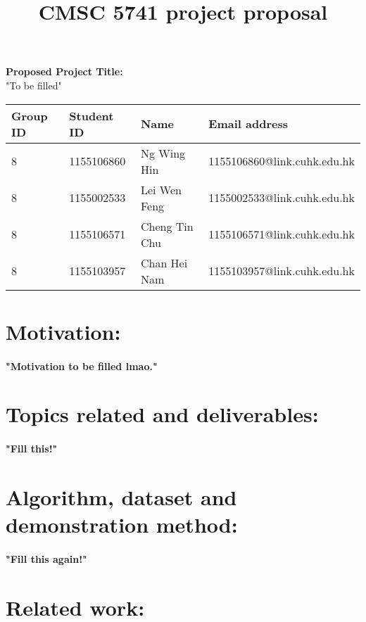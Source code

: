 \documentclass[12pt]{article}
\title{CMSC 5741 project proposal}
\date{}
\begin{document}
  \maketitle
\textbf{Proposed Project Title:}\\

"To be filled"
\\

\begin{center}
    \begin{tabular}{| l | l | l | l |}
    \hline
    Group ID & Student ID & Name & Email address \\ \hline
    8 & 1155106860 & Ng Wing Hin & 1155106860@link.cuhk.edu.hk  \\ \hline
    8 & 1155002533 & Lei Wen Feng & 1155002533@link.cuhk.edu.hk  \\ \hline
    8 & 1155106571 & Cheng Tin Chu & 1155106571@link.cuhk.edu.hk  \\ \hline
    8 & 1155103957 & Chan Hei Nam & 1155103957@link.cuhk.edu.hk  \\ \hline
    
    \end{tabular}
\end{center}

\section{Motivation:}
\paragraph{"Motivation to be filled lmao."}

\section{Topics related and deliverables:}
\paragraph{"Fill this!"}

\section{Algorithm, dataset and demonstration method:}
\paragraph{"Fill this again!"}

\section{Related work:}
\end{document}
